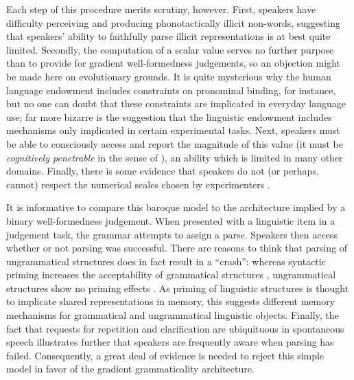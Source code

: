 Each step of this procedure merits scrutiny, however.
First, speakers have difficulty perceiving \citep{Berent2007a,Brown1956,Dupoux1999,Kabak2007a} and producing \citep{Davidson2005,Davidson2006a,Davidson2006b,Davidson2010,GallagherInPress,Rose2007,Vitevitch1998,Vitevitch2005} phonotactically illicit non-words, suggesting that speakers' ability to faithfully parse illicit representations is at best quite limited.
Secondly, the computation of a scalar value serves no further purpose than to provide for gradient well-formedness judgements, so an objection might be made here on evolutionary grounds.
It is quite mysterious why the human language endowment includes constraints on pronominal binding, for instance, but no one can doubt that these constraints are implicated in everyday language use; far more bizarre is the suggestion that the linguistic endowment includes mechanisms only implicated in certain experimental tasks.
Next, speakers must be able to consciously access and report the magnitude of this value (it must be \emph{cognitively penetrable} in the sense of \citealt{Pylyshyn1984}), an ability which is limited in many other domains.
Finally, there is some evidence that speakers do not (or perhaps, cannot) respect the numerical scales chosen by experimenters \citep{Sprouse2011}.

It is informative to compare this baroque model to the architecture implied by a binary well-formedness judgement.
When presented with a linguistic item in a judgement task, the grammar attempts to assign a parse. 
Speakers then access whether or not parsing was successful.
There are reasons to think that parsing of ungrammatical structures does in fact result in a ``crash'': whereas syntactic priming increases the acceptability of grammatical structures \citep{Luka2005}, ungrammatical structures show no priming effects \citep{Sprouse2007b}.
As priming of linguistic structures is thought to implicate shared representations in memory, this suggests different memory mechanisms for grammatical and ungrammatical linguistic objects.
Finally, the fact that requests for repetition and clarification are ubiquituous in spontaneous speech illustrates further that speakers are frequently aware when parsing has failed.
Consequently, a great deal of evidence is needed to reject this simple model in favor of the gradient grammaticality architecture.

